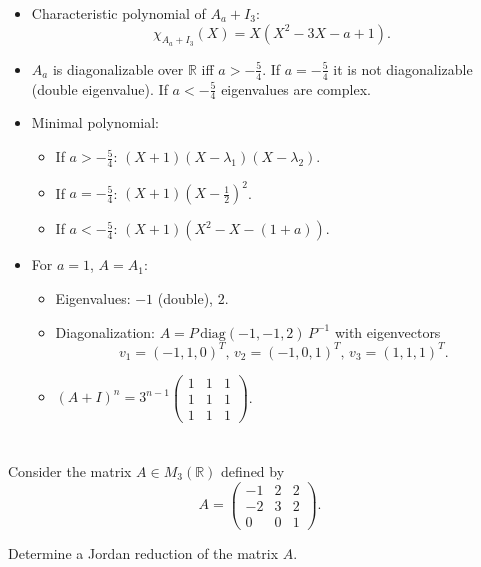 \documentclass[12pt]{article}
\begin{document}
\begin{answerbox}
\begin{itemize}
\item[(1)] Characteristic polynomial of $A_a + I_3$:
\[
\chi_{A_a+I_3}(X) = X\left(X^2 - 3X - a + 1\right).
\]


\item[(2)] $A_a$ is diagonalizable over $\mathbb{R}$ iff $a > -\tfrac{5}{4}$. If $a = -\tfrac{5}{4}$ it is not diagonalizable (double eigenvalue). If $a < -\tfrac{5}{4}$ eigenvalues are complex.


\item[(3)] Minimal polynomial:
\begin{itemize}
\item If $a > -\tfrac{5}{4}$: $(X+1)(X-\lambda_1)(X-\lambda_2)$.
\item If $a = -\tfrac{5}{4}$: $(X+1)\left(X-\tfrac12\right)^2$.
\item If $a < -\tfrac{5}{4}$: $(X+1)\left(X^2 - X - (1+a)\right)$.
\end{itemize}


\item[(4)] For $a = 1$, $A = A_1$:
\begin{itemize}
\item Eigenvalues: $-1$ (double), $2$.
\item Diagonalization: $A = P\,\mathrm{diag}(-1,-1,2)\,P^{-1}$ with eigenvectors
\[
v_1 = (-1,1,0)^T,\, v_2 = (-1,0,1)^T,\, v_3 = (1,1,1)^T.
\]
\item $(A+I)^n = 3^{n-1}
\begin{pmatrix}
1 & 1 & 1\\
1 & 1 & 1\\
1 & 1 & 1
\end{pmatrix}$.
\end{itemize}
\end{itemize}
\end{answerbox}

\section{}
Consider the matrix $A \in M_3(\mathbb{R})$ defined by
\[
A =
\begin{pmatrix}
-1 & 2 & 2 \\
-2 & 3 & 2 \\
0 & 0 & 1
\end{pmatrix}.
\]

Determine a Jordan reduction of the matrix $A$.
\end{document}
